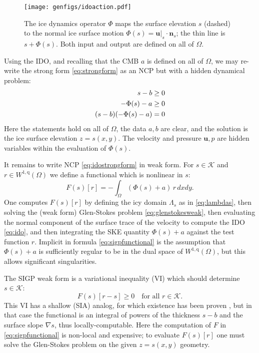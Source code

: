 \documentclass[letterpaper,final,12pt,reqno]{amsart}
\theoremstyle{claim}
\newcommand{\grad}{\nabla}
\newcommand{\bn}{\mathbf{n}}
\newcommand{\bu}{\mathbf{u}}
\newcommand{\qq}{{\text{q}}}
\numberwithin{equation}{section}
\numberwithin{figure}{section}
\numberwithin{table}{section}
\numberwithin{theorem}{section}
\begin{document}
\begin{figure}[t]
\begin{center}
\texttt{[image: genfigs/idoaction.pdf]}
\end{center}
\caption{The ice dynamics operator $\Phi$ maps the surface elevation $s$ (dashed) to the normal ice surface motion $\Phi(s)=\bu|_s \cdot \bn_s$; the thin line is $s+\Phi(s)$.  Both input and output are defined on all of $\Omega$.}
\label{fig:idoaction}
\end{figure}

Using the IDO, and recalling that the CMB $a$ is defined on all of $\Omega$, we may re-write the strong form \eqref{eq:strongform} as an NCP but with a hidden dynamical problem:
\begin{align}
s - b &\ge 0  \label{eq:idostrongform} \\
- \Phi(s) - a &\ge 0 \notag \\
(s - b) (- \Phi(s) - a) &= 0 \notag
\end{align}
Here the statements hold on all of $\Omega$, the data $a,b$ are clear, and the solution is the ice surface elevation $z=s(x,y)$.  The velocity and pressure $\bu,p$ are hidden variables within the evaluation of $\Phi(s)$.

It remains to write NCP \eqref{eq:idostrongform} in weak form.  For $s \in \mathcal{K}$ and $r \in W^{1,\qq}(\Omega)$ we define a functional which is nonlinear in $s$:
\begin{equation}
F(s)[r] = - \int_\Omega (\Phi(s) + a)\, r \,dx dy. \label{eq:sigpfunctional}
\end{equation}
One computes $F(s)[r]$ by defining the icy domain $\Lambda_s$ as in \eqref{eq:lambdas}, then solving the (weak form) Glen-Stokes problem \eqref{eq:glenstokesweak}, then evaluating the normal component of the surface trace of the velocity to compute the IDO \eqref{eq:ido}, and then integrating the SKE quantity $\Phi(s) + a$ against the test function $r$.  Implicit in formula \eqref{eq:sigpfunctional} is the assumption that $\Phi(s) + a$ is sufficiently regular to be in the dual space of $W^{1,\qq}(\Omega)$, but this allows significant singularities.

The SIGP weak form is a variational inequality (VI) \cite{KinderlehrerStampacchia1980} which should determine $s\in\mathcal{K}$:
\begin{equation}
F(s)[r - s] \ge 0 \quad \text{for all $r \in \mathcal{K}$.}  \label{eq:sigpweakform}
\end{equation}
This VI has a shallow (SIA) analog, for which existence has been proven \cite{JouvetBueler2012}, but in that case the functional is an integral of powers of the thickness $s-b$ and the surface slope $\grad s$, thus locally-computable.  Here the computation of $F$ in \eqref{eq:sigpfunctional} is non-local and expensive; to evaluate $F(s)[r]$ one must solve the Glen-Stokes problem on the given $z=s(x,y)$ geometry.
\end{document}
